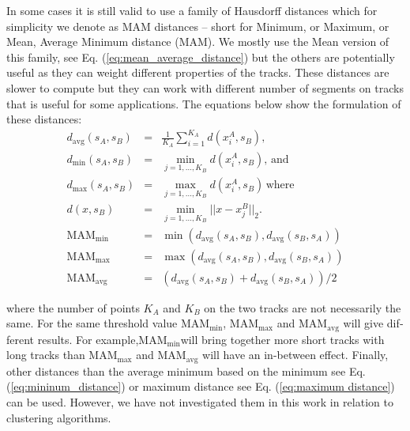 \documentclass[preprint,authoryear,a4paper,10pt,onecolumn]{elsarticle}
\begin{document}
In some cases it is still valid to use a family of Hausdorff distances
which for simplicity we denote as MAM distances -- short for Minimum,
or Maximum, or Mean, Average Minimum distance (MAM). We mostly use
the Mean version of this family, see Eq. (\ref{eq:mean_average_distance})
but the others are potentially useful as they can weight different
properties of the tracks. These distances are slower to compute but
they can work with different number of segments on tracks that is
useful for some applications. The equations below show the formulation
of these distances:\begin{eqnarray}
d_{\textrm{avg}}(s_{A},s_{B}) & = & \frac{1}{K_{A}}\sum_{i=1}^{K_{A}}d(x_{i}^{A},s_{B}),\nonumber \\
d_{\textrm{min}}(s_{A},s_{B}) & = & \min_{j=1,...,K_{B}}d(x_{i}^{A},s_{B}),\,\textrm{and}\label{eq:mininum_distance}\\
d_{\textrm{max}}(s_{A},s_{B}) & = & \max_{j=1,...,K_{B}}d(x_{i}^{A},s_{B})\,\textrm{where}\label{eq:maximum distance}\\
d(x,s_{B}) & = & \min_{j=1,...,K_{B}}||x-x_{j}^{B}||_{2}.\nonumber \\
\textrm{MAM}_{\textrm{min}} & = & \min(d_{\textrm{avg}}(s_{A},s_{B}),d_{\textrm{avg}}(s_{B},s_{A}))\label{eq:min_average_distance}\\
\textrm{MAM}_{\textrm{max}} & = & \max(d_{\textrm{avg}}(s_{A},s_{B}),d_{\textrm{avg}}(s_{B},s_{A}))\nonumber \\
\textrm{MAM}_{\textrm{avg}} & = & (d_{\textrm{avg}}(s_{A},s_{B})+d_{\textrm{avg}}(s_{B},s_{A}))/2\label{eq:mean_average_distance}\end{eqnarray}


where the number of points $K_{A}$ and $K_{B}$ on the two tracks
are not necessarily the same. For the same threshold value $\textrm{MAM}_{\textrm{min}}$,
\foreignlanguage{british}{$\textrm{MAM}_{\textrm{max}}$ and $\textrm{MAM}_{\textrm{avg}}$
will give different results. For example,}$\textrm{MAM}_{\textrm{min}}$will
bring together more short tracks with long tracks than $\textrm{MAM}_{\textrm{max}}$
and \foreignlanguage{british}{$\textrm{MAM}_{\textrm{avg}}$} will
have an in-between effect. Finally, other distances than the average
minimum based on the minimum see Eq. (\ref{eq:mininum_distance})
or maximum distance see Eq. (\ref{eq:maximum distance}) can be used.
However, we have not investigated them in this work in relation to
clustering algorithms.

\end{document}
